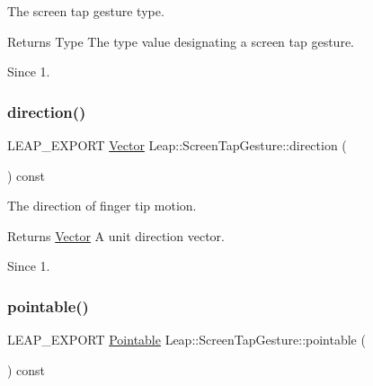 The screen tap gesture type.


\begin{DoxyCodeInclude}
\end{DoxyCodeInclude}


\begin{DoxyReturn}{Returns}
Type The type value designating a screen tap gesture. 
\end{DoxyReturn}
\begin{DoxySince}{Since}
1. 
\end{DoxySince}
\mbox{\label{class_leap_1_1_screen_tap_gesture_a50f50d4826e337931b7a904768089ae0}} 
\subsubsection{\texorpdfstring{direction()}{direction()}}
{\footnotesize\ttfamily L\+E\+A\+P\+\_\+\+E\+X\+P\+O\+RT \hyperlink{struct_leap_1_1_vector}{Vector} Leap\+::\+Screen\+Tap\+Gesture\+::direction (\begin{DoxyParamCaption}{ }\end{DoxyParamCaption}) const}

The direction of finger tip motion.


\begin{DoxyCodeInclude}
\end{DoxyCodeInclude}


\begin{DoxyReturn}{Returns}
\hyperlink{struct_leap_1_1_vector}{Vector} A unit direction vector. 
\end{DoxyReturn}
\begin{DoxySince}{Since}
1. 
\end{DoxySince}
\mbox{\label{class_leap_1_1_screen_tap_gesture_aaf74677fee3ed0d55f612152dae53c30}} 
\subsubsection{\texorpdfstring{pointable()}{pointable()}}
{\footnotesize\ttfamily L\+E\+A\+P\+\_\+\+E\+X\+P\+O\+RT \hyperlink{class_leap_1_1_pointable}{Pointable} Leap\+::\+Screen\+Tap\+Gesture\+::pointable (\begin{DoxyParamCaption}{ }\end{DoxyParamCaption}) const}

